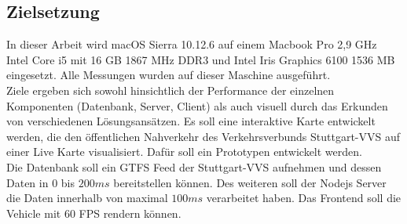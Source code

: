 \subsection{Zielsetzung}
\label{sub:zielsetzung}
  In dieser Arbeit wird macOS Sierra 10.12.6 auf einem Macbook Pro 2,9 GHz Intel Core i5 mit 16 GB 1867 MHz DDR3 und Intel Iris Graphics 6100 1536 MB eingesetzt. Alle Messungen wurden auf dieser Maschine ausgeführt.\\

  Ziele ergeben sich sowohl hinsichtlich der Performance der einzelnen Komponenten (Datenbank, Server, Client) als auch visuell durch das Erkunden von verschiedenen Lösungsansätzen. Es soll eine interaktive Karte entwickelt werden, die den öffentlichen Nahverkehr des Verkehrsverbunds Stuttgart-VVS auf einer Live Karte visualisiert. Dafür soll ein Prototypen entwickelt werden.\\

  Die Datenbank soll ein GTFS Feed der Stuttgart-VVS aufnehmen und dessen Daten in $0$ bis $200ms$ bereitstellen können. Des weiteren soll der Nodejs Server die Daten innerhalb von maximal $100ms$ verarbeitet haben. Das Frontend soll die Vehicle mit 60 FPS rendern können.

